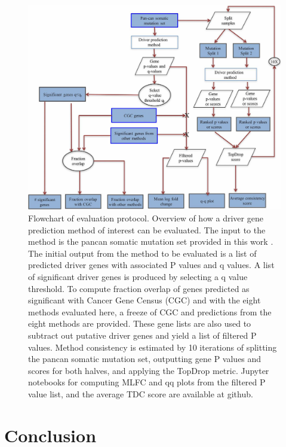 \begin{figure}
  \centering
  \makeatletter
  \let\@currsize\normalsize
  \includegraphics[width=0.9\linewidth]{figures/chapter4/flow_chart.jpg}
  \caption[Flowchart of driver gene evaluation protocol.]{Flowchart of evaluation protocol. Overview of how a driver gene prediction method of interest can be evaluated. The input to the method is the pancan somatic mutation set provided in this work \cite{RN70}. The initial output from the method to be evaluated is a list of predicted driver genes with associated P values and q values. A list of significant driver genes is produced by selecting a q value threshold. To compute fraction overlap of genes predicted as significant with Cancer Gene Census (CGC) and with the eight methods evaluated here, a freeze of CGC and predictions from the eight methods are provided. These gene lists are also used to subtract out putative driver genes and yield a list of filtered P values. Method consistency is estimated by 10 iterations of splitting the pancan somatic mutation set, outputting gene P values and scores for both halves, and applying the TopDrop metric. Jupyter notebooks for computing MLFC and qq plots from the filtered P value list, and the average TDC score are available at github.}
  \label{fig:flow_chart}
\end{figure}

\section{Conclusion}

